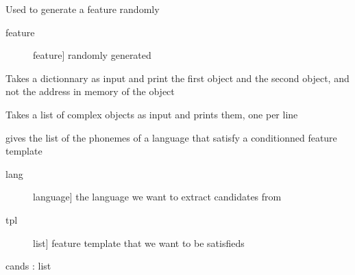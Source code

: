 \documentclass[letterpaper,10pt,english]{sphinxmanual}
\begin{document}
\begin{fulllineitems}
\label{\detokenize{index:utilitaries.feature_random_generator}}
\sphinxAtStartPar
Used to generate a feature randomly
\begin{description}
\item[{feature}] \leavevmode{[}feature{]}
\sphinxAtStartPar
randomly generated

\end{description}

\end{fulllineitems}


\begin{fulllineitems}
\label{\detokenize{index:utilitaries.printd}}
\sphinxAtStartPar
Takes a dictionnary as input and print the first object and the second object, and not the address in memory of the object

\end{fulllineitems}


\begin{fulllineitems}
\label{\detokenize{index:utilitaries.printl}}
\sphinxAtStartPar
Takes a list of complex objects as input and prints them, one per line

\end{fulllineitems}


\begin{fulllineitems}
\label{\detokenize{index:utilitaries.tpl_2_candidates}}
\sphinxAtStartPar
gives the list of the phonemes of a language that satisfy a conditionned feature template
\begin{description}
\item[{lang}] \leavevmode{[}language{]}
\sphinxAtStartPar
the language we want to extract candidates from

\item[{tpl}] \leavevmode{[}list{]}
\sphinxAtStartPar
feature template that we want to be satisfieds

\end{description}

\sphinxAtStartPar
cands : list

\end{fulllineitems}
\end{document}
